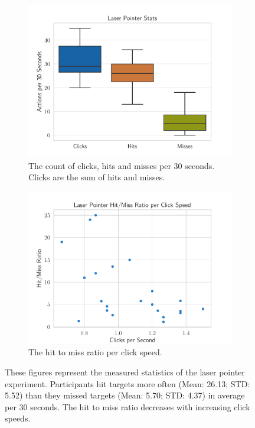 \begin{figure}[H]
	\centering
	\begin{subfigure}[t]{.48\linewidth}%
		\centering
		\includegraphics[width=\linewidth]{figures/evaluation/eval_exp_lp.pdf}
		\caption{The count of clicks, hits and misses per 30 seconds. Clicks are the sum of hits and misses.}\label{fig:eval-exp-lp}
	\end{subfigure}%
	\hspace{0.02\linewidth}%
	\begin{subfigure}[t]{.48\linewidth}%
		\centering
		\includegraphics[width=\linewidth]{figures/evaluation/eval_exp_lp_ratio_scatter.pdf}
		\caption{The hit to miss ratio per click speed.}\label{fig:eval-exp-lp-ratio-scatter} %
	\end{subfigure}%
	\caption[Laser pointer task results]{These figures represent the measured statistics of the laser pointer experiment. Participants hit targets more often (Mean: 26.13; \gls{STD}: 5.52) than they missed targets (Mean: 5.70; \gls{STD}: 4.37) in average per 30 seconds. The hit to miss ratio decreases with increasing click speeds.}\label{fig:exp-lp-eval}
\end{figure}

